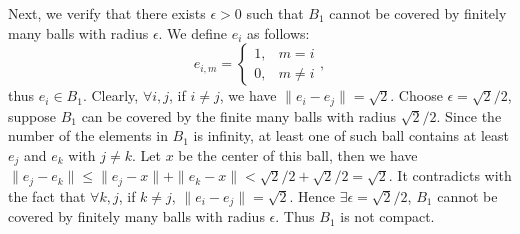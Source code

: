 \documentclass[12pt,a4paper]{ctexart}
\begin{document}
Next, we verify that there exists $ \epsilon > 0$ such that $B_{1}$ cannot be covered by finitely many balls with radius $\epsilon$. We define $e_{i}$ as follows:
\begin{equation*}
e_{i,m} =
\left\{
             \begin{array}{cl}
             1, & m = i \\
             0, & m \neq i
             \end{array},
\right.
\end{equation*}
thus $e_{i} \in B_1$. Clearly, $\forall i, j$, if $i \neq j$,  we have  $\|e_{i} - e_{j} \| = \sqrt{2}$. Choose $\epsilon = \sqrt{2}/2$, suppose $B_{1}$ can be covered by the finite many balls with radius $\sqrt{2}/2$. Since the number of the elements in $B_1$ is infinity, at least one of such ball contains at least $e_{j}$ and $e_{k}$ with $j \neq k$. Let $x$ be the center of this ball, then we have $\|e_{j}  - e_{k}\| \leq \|e_{j} - x\| + \|e_{k} - x\| < \sqrt{2}/2 + \sqrt{2}/2 =  \sqrt{2}$. It contradicts with the fact that $\forall k, j$, if $k \neq j$,  $\|e_{i} - e_{j} \| = \sqrt{2}$. Hence $\exists \epsilon  = \sqrt{2}/2$, $B_{1}$ cannot be covered by finitely many balls with radius $\epsilon$. Thus $B_{1}$ is  not compact.
\end{document}
